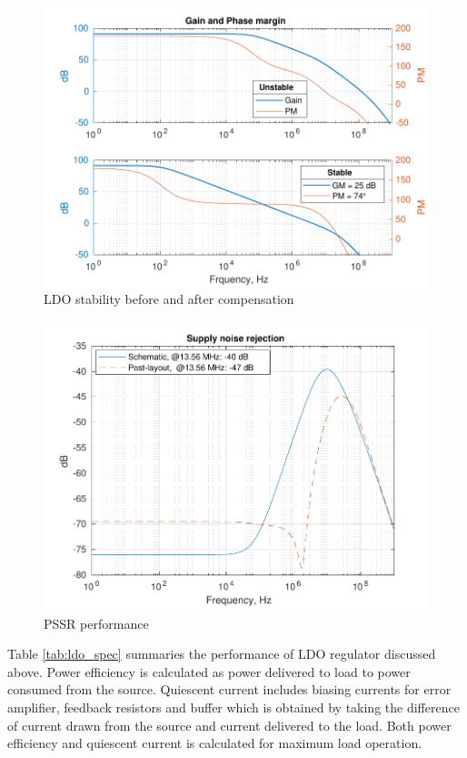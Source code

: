 \documentclass[12pt,a4paper,UKenglish]{report}
\begin{document}
\begin{figure}[H] %
   \centering
   \includegraphics[width=\textwidth]{img/ldo_ac.pdf} 
   \caption{LDO stability before and after compensation}
   \label{fig:ldo_sta}
\end{figure}

\begin{figure}[H] %
   \centering
   \includegraphics[width=\textwidth]{img/ldo_pssr_both.pdf} 
   \caption{PSSR performance}
   \label{fig:ldo_pssr}
\end{figure}

Table \ref{tab:ldo_spec} summaries the performance of LDO regulator discussed above. Power efficiency is calculated as power delivered to load to power consumed 
from the source. Quiescent current includes biasing currents for error amplifier, feedback resistors and buffer which is obtained by taking the difference of current 
drawn from the source and current delivered to the load. Both power efficiency and quiescent current is calculated for maximum load operation. 
\end{document}
